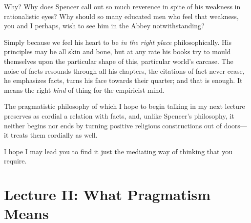 \documentclass[]{article}
\begin{document}
Why? Why does Spencer call out so much reverence in spite of his
weakness in rationalistic eyes? Why should so many educated men who
feel that weakness, you and I perhaps, wish to see him in the Abbey
notwithstanding?

Simply because we feel his heart to be \emph{in the right place}
philosophically. His principles may be all skin and bone, but at any
rate his books try to mould themselves upon the particular shape of
this, particular world's carcase. The noise of facts resounds through
all his chapters, the citations of fact never cease, he emphasizes
facts, turns his face towards their quarter; and that is enough. It
means the right \emph{kind} of thing for the empiricist mind.

The pragmatistic philosophy of which I hope to begin talking in my
next lecture preserves as cordial a relation with facts, and, unlike
Spencer's philosophy, it neither begins nor ends by turning positive
religious constructions out of doors--- it treats them cordially as well.

I hope I may lead you to find it just the mediating way of thinking that
you require.


\section*{Lecture II: What Pragmatism Means}
\end{document}
